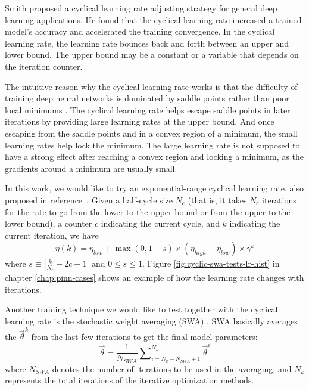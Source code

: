 Smith \cite{smith_cyclical_2017} proposed a cyclical learning rate adjusting strategy for general deep learning applications.
He found that the cyclical learning rate increased a trained model's accuracy and accelerated the training convergence.
In the cyclical learning rate, the learning rate bounces back and forth between an upper and lower bound.
The upper bound may be a constant or a variable that depends on the iteration counter.

The intuitive reason why the cyclical learning rate works is that the difficulty of training deep neural networks is dominated by saddle points rather than poor local minimums \cite{dauphin_identifying_2014}.
The cyclical learning rate helps escape saddle points in later iterations by providing large learning rates at the upper bound.
And once escaping from the saddle points and in a convex region of a minimum, the small learning rates help lock the minimum.
The large learning rate is not supposed to have a strong effect after reaching a convex region and locking a minimum, as the gradients around a minimum are usually small.

In this work, we would like to try an exponential-range cyclical learning rate, also proposed in reference~\cite{smith_cyclical_2017}.
Given a half-cycle size $N_c$ (that is, it takes $N_c$ iterations for the rate to go from the lower to the upper bound or from the upper to the lower bound), a counter $c$ indicating the current cycle, and $k$ indicating the current iteration, we have
\begin{equation}\label{eq:cyclical-learning-rate}
    \eta(k) = \eta_{low} + \max(0, 1-s)\times(\eta_{high}-\eta_{low})\times\gamma^k
\end{equation}
where $s \equiv \left\lvert \frac{k}{N_c} - 2c + 1\right\rvert$ and $0 \le s \le 1$.
Figure \ref{fig:cyclic-swa-tests-lr-hist} in chapter \ref{chap:pinn-cases} shows an example of how the learning rate changes with iterations. 

Another training technique we would like to test together with the cyclical learning rate is the stochastic weight averaging (SWA) \cite{izmailov_averaging_2019}.
SWA basically averages the $\vec{\theta}^k$ from the last few iterations to get the final model parameters:
\begin{equation}
    \vec{\theta} = \frac{1}{N_{SWA}}\sum\nolimits_{i=N_k-N_{SWA}+1}^{N_k} \vec{\theta}^i
\end{equation}
where $N_{SWA}$ denotes the number of iterations to be used in the averaging, and $N_k$ represents the total iterations of the iterative optimization methods.

